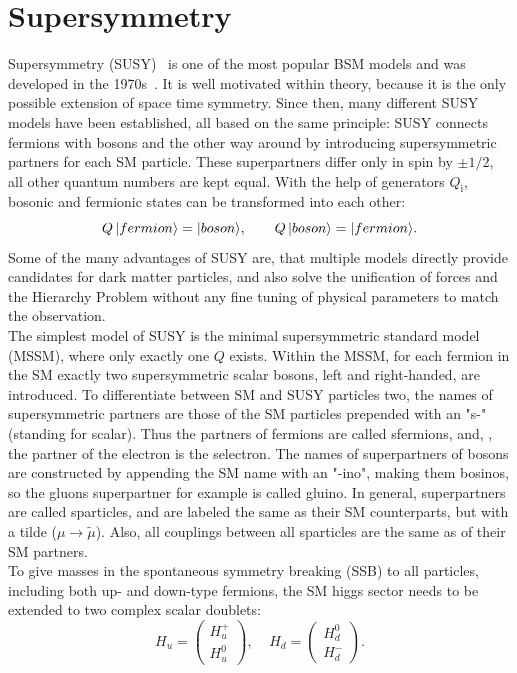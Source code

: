 \section{Supersymmetry}\label{sec:SUSY}
Supersymmetry (SUSY)~\cite{SUSYOriginal,SUSYPrimer} is one of the most popular BSM models and was developed in the 1970s~\cite{SUSYTheorem,HAAG1975257}. It is well motivated within theory, because it is the only possible extension of space time symmetry. Since then, many different SUSY models have been established, all based on the same principle: SUSY connects fermions with bosons and the other way around by introducing supersymmetric partners for each SM particle. These superpartners differ only in spin by $\pm1/2$, all other quantum numbers are kept equal. With the help of generators $Q_\text{i}$, bosonic and fermionic states can be transformed into each other:
\begin{equation}
 Q\,\lvert fermion\rangle=\lvert boson\rangle,~~~~~~ Q\,\lvert boson\rangle=\lvert fermion\rangle.
\end{equation}
Some of the many advantages of SUSY are, that multiple models directly provide candidates for dark matter particles, and also solve the unification of forces and the Hierarchy Problem without any fine tuning of physical parameters to match the observation.\\
The simplest model of SUSY is the minimal supersymmetric standard model (MSSM), where only exactly one $Q$ exists. Within the MSSM, for each fermion in the SM exactly two supersymmetric scalar bosons, left and right-handed, are introduced. To differentiate between SM and SUSY particles two, the names of supersymmetric partners are those of the SM particles prepended with an "s-" (standing for scalar). Thus the partners of fermions are called sfermions, and, \eg, the partner of the electron is the selectron. The names of superpartners of bosons are constructed by appending the SM name with an "-ino", making them bosinos, so the gluons superpartner for example is called gluino. In general, superpartners are called sparticles, and are labeled the same as their SM counterparts, but with a tilde ($\mu \to \widetilde{\mu}$). Also, all couplings between all sparticles are the same as of their SM partners.\\
To give masses in the spontaneous symmetry breaking (SSB) to all particles, including both up- and down-type fermions, the SM higgs sector needs to be extended to two complex scalar doublets:
\begin{equation}
 H_u=  \left(
 \begin{matrix}
  H_u^+ \\
  H_u^0
 \end{matrix}
 \right),~~~~~
 H_d=  \left(
 \begin{matrix}
  H_d^0 \\
  H_d^-
 \end{matrix}
 \right).
\end{equation}
